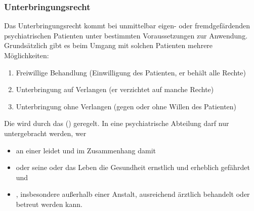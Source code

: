 \subsubsection{Unterbringungsrecht}

Das Unterbringungsrecht kommt bei unmittelbar eigen- oder
fremdgefärdenden psychiatrischen Patienten unter
bestimmten Voraussetzungen zur Anwendung.
Grundsätzlich gibt es beim Umgang mit solchen Patienten
mehrere Möglichkeiten:

\begin{enumerate}
  \item Freiwillige Behandlung (Einwilligung des Patienten,
  er behält alle Rechte)
  \item Unterbringung auf Verlangen (er
  verzichtet auf manche Rechte)
  \item Unterbringung ohne Verlangen (gegen oder ohne Willen
  des Patienten)
\end{enumerate}


Die  wird durch das
 () geregelt.
In eine psychiatrische Abteilung darf nur untergebracht
werden, wer
\begin{itemize}
  \item an einer  leidet und im
  Zusammenhang damit
\item {} oder seine  oder das Leben
   die Gesundheit  ernstlich und erheblich
  gefährdet und
  \item {}, insbesondere außerhalb einer
  Anstalt, ausreichend ärztlich behandelt oder betreut
  werden kann.
\end{itemize}





